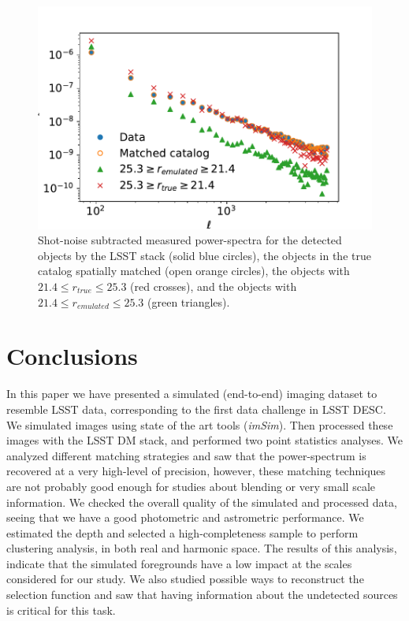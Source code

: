 \documentclass[\docopts]{\docclass}
\begin{document}
\begin{figure}
\centering
\includegraphics[width=0.9\columnwidth]{emulated_power_spectra}
\caption{Shot-noise subtracted measured power-spectra for the detected objects by the LSST stack (solid blue circles), the objects in the true catalog spatially matched (open orange circles), the objects with $21.4 \leq r_{true} \leq 25.3$ (red crosses), and the objects with $21.4 \leq r_{emulated} \leq 25.3$ (green triangles).}
\label{fig:emulated_power}
\end{figure}


\section{Conclusions}
\label{sec:conclusions}

In this paper we have presented a simulated (end-to-end) imaging dataset to resemble LSST data, corresponding to the first data challenge in LSST DESC. We simulated images using state of the art tools (\textit{imSim}). Then processed these images with the LSST DM stack, and performed two point statistics analyses. We analyzed different matching strategies and saw that the power-spectrum is recovered at a very high-level of precision, however, these matching techniques are not probably good enough for studies about blending or very small scale information. We checked the overall quality of the simulated and processed data, seeing that we have a good photometric and astrometric performance. We estimated the depth and selected a high-completeness sample to perform clustering analysis, in both real and harmonic space. The results of this analysis, indicate that the simulated foregrounds have a low impact at the scales considered for our study. We also studied possible ways to reconstruct the selection function and saw that having information about the undetected sources is critical for this task.
\end{document}
